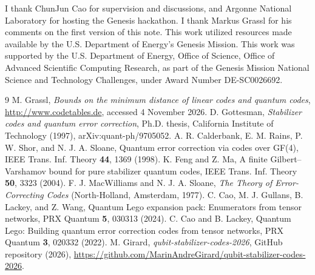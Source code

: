 \documentclass[reprint,pra,superscriptaddress,nofootinbib]{revtex4-2}
\begin{document}
\begin{acknowledgments}
I thank ChunJun Cao for supervision and discussions, and Argonne National Laboratory for hosting the Genesis hackathon. I thank Markus Grassl for his comments on the first version of this note. This work utilized resources made available by the U.S. Department of Energy's Genesis Mission. This work was supported by the U.S. Department of Energy, Office of Science, Office of Advanced Scientific Computing Research, as part of the Genesis Mission National Science and Technology Challenges, under Award Number DE-SC0026692.
\end{acknowledgments}

\begin{thebibliography}{9}
 M. Grassl, \emph{Bounds on the minimum distance of linear codes and quantum codes},
\url{http://www.codetables.de}, accessed 4 November 2026.
 D. Gottesman, \emph{Stabilizer codes and quantum error correction}, Ph.D. thesis, California
Institute of Technology (1997), arXiv:quant-ph/9705052.
 A. R. Calderbank, E. M. Rains, P. W. Shor, and N. J. A. Sloane, Quantum error correction via codes over
GF(4), IEEE Trans. Inf. Theory \textbf{44}, 1369 (1998).
 K. Feng and Z. Ma, A finite Gilbert--Varshamov bound for pure stabilizer quantum codes, IEEE
Trans. Inf. Theory \textbf{50}, 3323 (2004).
 F. J. MacWilliams and N. J. A. Sloane, \emph{The Theory of Error-Correcting Codes}
(North-Holland, Amsterdam, 1977).
 C. Cao, M. J. Gullans, B. Lackey, and Z. Wang, Quantum Lego expansion pack: Enumerators from
tensor networks, PRX Quantum \textbf{5}, 030313 (2024).
 C. Cao and B. Lackey, Quantum Lego: Building quantum error correction codes from tensor networks, PRX
Quantum \textbf{3}, 020332 (2022).
 M. Girard, \emph{qubit-stabilizer-codes-2026}, GitHub repository (2026),
\url{https://github.com/MarinAndreGirard/qubit-stabilizer-codes-2026}.
\end{thebibliography}
\end{document}
